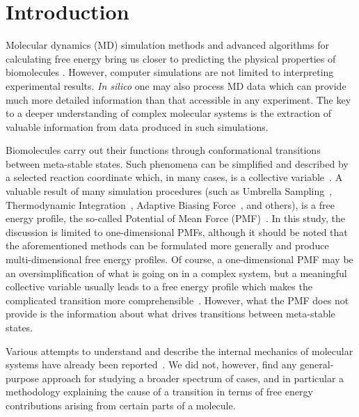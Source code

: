 \documentclass[a4paper,11pt,twoside]{book}%
\begin{document}
\clearpage


\section{Introduction}

Molecular dynamics (MD) simulation methods and advanced algorithms for calculating free energy bring us closer to predicting the physical properties of biomolecules \cite{woo2005calculation,chipot2014frontiers,comer2014adaptive}.
However, computer simulations are not limited to interpreting experimental results.
\emph{In silico} one may also process MD data which can provide much more detailed information than that accessible in any experiment.
The key to a deeper understanding of complex molecular systems is the extraction of valuable information from data produced in such simulations.

Biomolecules carry out their functions through conformational transitions between meta-stable states.
Such phenomena can be simplified and described by a selected reaction coordinate which, in many cases, is a collective variable~\cite{chipot2007free}.
A valuable result of many simulation procedures (such as Umbrella Sampling~\cite{torrie1977nonphysical}, Thermodynamic Integration~\cite{kirkwood1935statistical}, Adaptive Biasing Force~\cite{comer2014adaptive}, and others\cite{gumbart2012standard}), is a free energy profile, the so-called Potential of Mean Force (PMF)~\cite{kirkwood1935statistical}.
{\color{black}In this study, the discussion is limited to one-dimensional PMFs, although it should be noted that the aforementioned methods can be formulated more generally and produce multi-dimensional free energy profiles.}
Of course, a one-dimensional PMF may be an oversimplification of what is going on in a complex system, but a meaningful collective variable usually leads to a free energy profile which makes the complicated transition more comprehensible~\cite{periole2012structural,chipot2014frontiers}.
However, what the PMF does not provide is the information about what drives transitions between meta-stable states.

Various attempts to understand and describe the internal mechanics of {\color{black}molecular systems} have already been reported~\cite{arnautova2011development,bao2009protein,chiang2013molecular,lavery2007protein,sacquin2014motions,van1997engineering,seifert2013protein}.
We did not, however, find any general-purpose approach for studying a broader spectrum of cases, and in particular a methodology explaining the cause of a transition in terms of free energy contributions arising from certain parts of a molecule.
\end{document}
